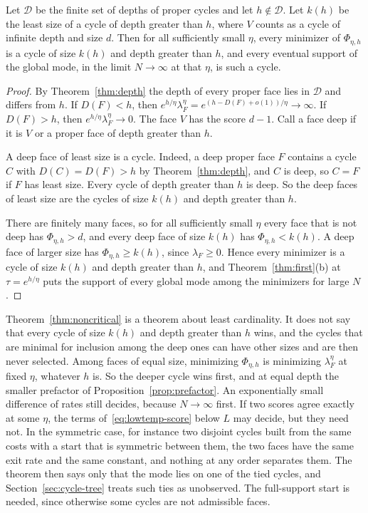 \begin{theorem}\label{thm:noncritical}
Let $\mathcal D$ be the finite set of depths of proper cycles and let
$h\notin\mathcal D$. Let $k(h)$ be the least size of a cycle of depth greater
than $h$, where $V$ counts as a cycle of infinite depth and size $d$. Then for
all sufficiently small $\eta$, every minimizer of $\Phi_{\eta,h}$ is a cycle of
size $k(h)$ and depth greater than $h$, and every eventual support of the
global mode, in the limit $N\to\infty$ at that $\eta$, is such a cycle.
\end{theorem}

\begin{proof}
By Theorem~\ref{thm:depth} the depth of every proper face lies in $\mathcal D$
and differs from $h$. If $D(F)<h$, then
$e^{h/\eta}\lambda^\eta_F=e^{(h-D(F)+o(1))/\eta}\to\infty$. If $D(F)>h$, then
$e^{h/\eta}\lambda^\eta_F\to0$. The face $V$ has the score $d-1$. Call a face
deep if it is $V$ or a proper face of depth greater than $h$.

A deep face of least size is a cycle. Indeed, a deep proper face $F$ contains a
cycle $C$ with $D(C)=D(F)>h$ by Theorem~\ref{thm:depth}, and $C$ is deep, so
$C=F$ if $F$ has least size. Every cycle of depth greater than $h$ is deep. So
the deep faces of least size are the cycles of size $k(h)$ and depth greater
than $h$.

There are finitely many faces, so for all sufficiently small $\eta$ every face
that is not deep has $\Phi_{\eta,h}>d$, and every deep face of size $k(h)$ has
$\Phi_{\eta,h}<k(h)$. A deep face of larger size has $\Phi_{\eta,h}\ge k(h)$,
since $\lambda_F\ge0$. Hence every minimizer is a cycle of size $k(h)$ and
depth greater than $h$, and Theorem~\ref{thm:first}(b) at $\tau=e^{h/\eta}$
puts the support of every global mode among the minimizers for large $N$.
\end{proof}

Theorem~\ref{thm:noncritical} is a theorem about least cardinality. It does
not say that every cycle of size $k(h)$ and depth greater than $h$ wins, and
the cycles that are minimal for inclusion among the deep ones can have other
sizes and are then never selected. Among faces of equal size, minimizing
$\Phi_{\eta,h}$ is minimizing $\lambda^\eta_F$ at fixed $\eta$, whatever $h$
is. So the deeper cycle wins first, and at equal depth the smaller prefactor of
Proposition~\ref{prop:prefactor}. An exponentially small difference of rates
still decides, because $N\to\infty$ first. If two scores agree exactly at some
$\eta$, the terms of~\eqref{eq:lowtemp-score} below $L$ may decide, but they need
not. In the symmetric case, for instance two disjoint cycles built from the same costs
with a start that is symmetric between them, the two faces have the same exit rate and
the same constant, and nothing at any order separates them. The theorem then says only
that the mode lies on one of the tied cycles, and Section~\ref{sec:cycle-tree} treats
such ties as unobserved. The full-support start is needed, since otherwise some cycles
are not admissible faces.

